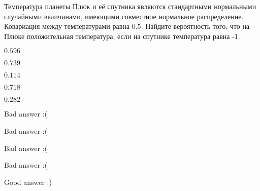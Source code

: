 
\begin{question}
Температура планеты Плюк и её спутника являются стандартными нормальными
случайными величинами, имеющими совместное нормальное распределение.
Ковариация между температурами равна \(0.5\). Найдите вероятность того,
что на Плюке положительная температура, если на спутнике температура
равна -1.
\begin{answerlist}
  \item \(0.596\)
  \item \(0.739\)
  \item \(0.114\)
  \item \(0.718\)
  \item \(0.282\)
\end{answerlist}
\end{question}

\begin{solution}
\begin{answerlist}
  \item Bad answer :(
  \item Bad answer :(
  \item Bad answer :(
  \item Bad answer :(
  \item Good answer :)
\end{answerlist}
\end{solution}

